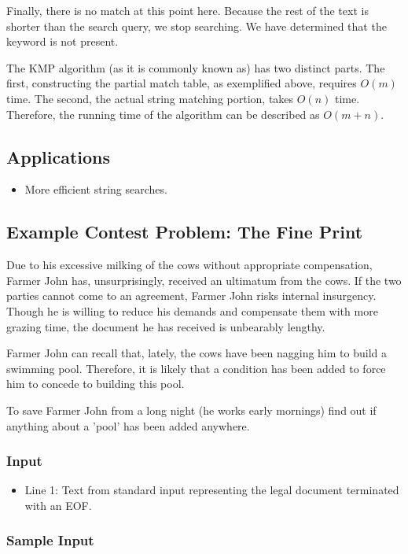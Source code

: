 Finally, there is no match at this point here.
Because the rest of the text is shorter than the search query, we stop searching.
We have determined that the keyword is not present.

The KMP algorithm (as it is commonly known as) has two distinct parts.
The first, constructing the partial match table, as exemplified above, requires $O(m)$ time.
The second, the actual string matching portion, takes $O(n)$ time.
Therefore, the running time of the algorithm can be described as $O(m + n)$.

\subsection{Applications}
\begin{itemize}
	\item More efficient string searches.
\end{itemize}

\subsection{Example Contest Problem: The Fine Print}
Due to his excessive milking of the cows without appropriate compensation, Farmer John has, unsurprisingly, received an ultimatum from the cows.
If the two parties cannot come to an agreement, Farmer John risks internal insurgency.
Though he is willing to reduce his demands and compensate them with more grazing time, the document he has received is unbearably lengthy.

Farmer John can recall that, lately, the cows have been nagging him to build a swimming pool.
Therefore, it is likely that a condition has been added to force him to concede to building this pool.

To save Farmer John from a long night (he works early mornings) find out if anything about a 'pool' has been added anywhere.

\subsubsection{Input}
\begin{itemize}
	\item Line 1: Text from standard input representing the legal document terminated with an EOF.
\end{itemize}

\subsubsection{Sample Input}


